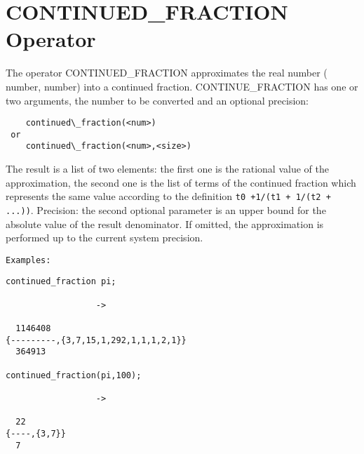 \section{CONTINUED\_FRACTION Operator}

The operator CONTINUED\_FRACTION approximates the real number 
(  number,  number)
into a continued fraction. CONTINUE_FRACTION has one or
two arguments, the number to be converted and an optional
precision:
\begin{verbatim}
    continued\_fraction(<num>)
 or
    continued\_fraction(<num>,<size>)
\end{verbatim}
The result is a list of two elements: the
first one is the rational value of the approximation, the second one
is the list of terms of the continued fraction which represents the
same value according to the definition \verb&t0 +1/(t1 + 1/(t2 + ...))&.
Precision: the second optional parameter  is an upper bound
for the absolute value of the result denominator. If omitted, the
approximation is performed up to the current system precision.

{\tt Examples:}
\begin{verbatim}
continued_fraction pi;

                  ->

  1146408
{---------,{3,7,15,1,292,1,1,1,2,1}}
  364913

continued_fraction(pi,100);

                  ->

  22
{----,{3,7}}
  7


\end{verbatim}
